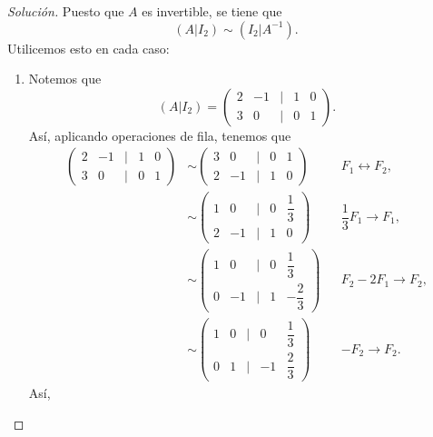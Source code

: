 \documentclass[a4,11pt]{aleph-notas}
\begin{document}
\begin{proof}[Solución]\hspace{0pt}
    Puesto que $A$ es invertible, se tiene que 
    \[
        (A|I_2)\sim (I_2|A^{-1}).
    \]
    Utilicemos esto en cada caso:
    \begin{enumerate}
        \item Notemos que 
        \[
           (A|I_2) =  \begin{pmatrix}
                2 & -1 & | & 1 & 0\\ 3 & 0 & | & 0 & 1
            \end{pmatrix}.
        \]
            Así, aplicando operaciones de fila, tenemos que 
        \begin{align*}
            \begin{pmatrix}
                2 & -1 & | & 1 & 0\\[0.75em]
                3 & 0 & | & 0 & 1
            \end{pmatrix}& \sim \begin{pmatrix}
                3 & 0 & | & 0 & 1 \\[0.75em]
                2 & -1 & | & 1 & 0
            \end{pmatrix} && F_1 \leftrightarrow F_2,  \\[0.25em]
            &\sim \begin{pmatrix}
                1 & 0 & | & 0 & \dfrac{1}{3} \\[0.75em]
                2 & -1 & | & 1 & 0
            \end{pmatrix} && \dfrac{1}{3}F_1 \rightarrow F_1, \\[0.25em]
            & \sim \begin{pmatrix}
                1 & 0 & | & 0 & \dfrac{1}{3} \\[0.75em]
                0 & -1 & | & 1 & -\dfrac{2}{3}
            \end{pmatrix} && F_2 - 2 F_1 \rightarrow F_2, \\[0.25em]
            & \sim \begin{pmatrix}
                1 & 0 & | & 0 & \dfrac{1}{3} \\[0.75em]
                0 & 1 & | & -1 & \dfrac{2}{3}
            \end{pmatrix} && -F_2 \rightarrow F_2.
        \end{align*}
        Así, 

\end{enumerate}
\end{proof}
\end{document}
